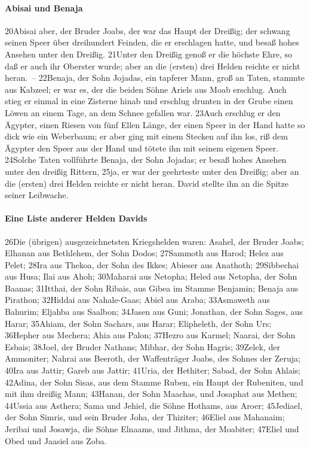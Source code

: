 \hypertarget{abisai-und-benaja}{%
\paragraph{Abisai und Benaja}\label{abisai-und-benaja}}

20Abisai aber, der Bruder Joabs, der war das Haupt der Dreißig; der
schwang seinen Speer über dreihundert Feinden, die er erschlagen hatte,
und besaß hohes Ansehen unter den Dreißig. 21Unter den Dreißig genoß er
die höchste Ehre, so daß er auch ihr Oberster wurde; aber an die
(ersten) drei Helden reichte er nicht heran.~-- 22Benaja, der Sohn
Jojadas, ein tapferer Mann, groß an Taten, stammte aus Kabzeel; er war
es, der die beiden Söhne Ariels aus Moab erschlug. Auch stieg er einmal
in eine Zisterne hinab und erschlug drunten in der Grube einen Löwen an
einem Tage, an dem Schnee gefallen war. 23Auch erschlug er den Ägypter,
einen Riesen von fünf Ellen Länge, der einen Speer in der Hand hatte so
dick wie ein Weberbaum; er aber ging mit einem Stecken auf ihn los, riß
dem Ägypter den Speer aus der Hand und tötete ihn mit seinem eigenen
Speer. 24Solche Taten vollführte Benaja, der Sohn Jojadas; er besaß
hohes Ansehen unter den dreißig Rittern, 25ja, er war der geehrteste
unter den Dreißig; aber an die (ersten) drei Helden reichte er nicht
heran. David stellte ihn an die Spitze seiner Leibwache.

\hypertarget{eine-liste-anderer-helden-davids}{%
\paragraph{Eine Liste anderer Helden
Davids}\label{eine-liste-anderer-helden-davids}}

26Die (übrigen) ausgezeichnetsten Kriegshelden waren: Asahel, der Bruder
Joabs; Elhanan aus Bethlehem, der Sohn Dodos; 27Sammoth aus Harod; Helez
aus Pelet; 28Ira aus Thekoa, der Sohn des Ikkes; Abieser aus Anathoth;
29Sibbechai aus Husa; Ilai aus Ahoh; 30Maharai aus Netopha; Heled aus
Netopha, der Sohn Baanas; 31Itthai, der Sohn Ribais, aus Gibea im Stamme
Benjamin; Benaja aus Pirathon; 32Hiddai aus Nahale-Gaas; Abiel aus
Araba; 33Asmaweth aus Bahurim; Eljahba aus Saalbon; 34Jasen aus Guni;
Jonathan, der Sohn Sages, aus Harar; 35Ahiam, der Sohn Sachars, aus
Harar; Elipheleth, der Sohn Urs; 36Hepher aus Mechera; Ahia aus Palon;
37Hezro aus Karmel; Naarai, der Sohn Esbais; 38Joel, der Bruder Nathans;
Mibhar, der Sohn Hagris; 39Zelek, der Ammoniter; Nahrai aus Beeroth, der
Waffenträger Joabs, des Sohnes der Zeruja; 40Ira aus Jattir; Gareb aus
Jattir; 41Uria, der Hethiter; Sabad, der Sohn Ahlais; 42Adina, der Sohn
Sisas, aus dem Stamme Ruben, ein Haupt der Rubeniten, und mit ihm
dreißig Mann; 43Hanan, der Sohn Maachas, und Josaphat aus Methen;
44Ussia aus Asthera; Sama und Jehiel, die Söhne Hothams, aus Aroer;
45Jediael, der Sohn Simris, und sein Bruder Joha, der Thiziter; 46Eliel
aus Mahanaim; Jeribai und Josawja, die Söhne Elnaams, und Jithma, der
Moabiter; 47Eliel und Obed und Jaasiel aus Zoba.

